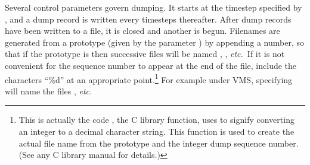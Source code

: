 \documentclass[a4paper,twoside]{report}
\newcommand{\etc}{\emph{etc.}}
\begin{document}
Several control parameters govern dumping. It starts at the timestep
specified by , and a dump record is written every
 timesteps thereafter.  After 
dump records have been written to a file, it is closed and another is
begun. Filenames are generated from a prototype (given by the
parameter ) by appending a number, so that if the
prototype is  then successive files will be named
, ,  \etc\ If it is
not convenient for the sequence number to appear at the end of the
file, include the characters ``\%d'' at an appropriate
point.\footnote{This is actually the code , the C
  library function, uses to signify converting an integer to a decimal
  character string. This function is used to create the actual file
  name from the prototype and the integer dump sequence number. (See
  any C library manual for details.)}  For example under VMS,
specifying  will name the files
,  \etc
\end{document}

